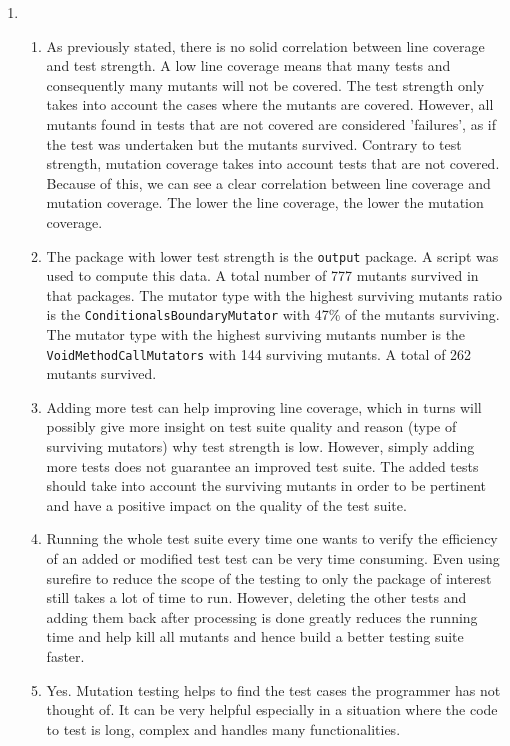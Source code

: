 \begin{enumerate}
    \item 
        \begin{enumerate}[label={\alph*.}]
            \item As previously stated, there is no solid correlation between line coverage and test strength. A low line coverage means that many tests and consequently many mutants will not be covered. The test strength only takes into account the cases where the mutants are covered. However, all mutants found in tests that are not covered are considered 'failures', as if the test was undertaken but the mutants survived. Contrary to test strength, mutation coverage takes into account tests that are not covered. Because of this, we can see a clear correlation between line coverage and mutation coverage. The lower the line coverage, the lower the mutation coverage.
            \item The package with lower test strength is the \verb|output| package. A script was used to compute this data. A total number of 777 mutants survived in that packages. The mutator type with the highest surviving mutants ratio is the \verb|ConditionalsBoundaryMutator| with 47\% of the mutants surviving. The mutator type with the highest surviving mutants number is the \verb|VoidMethodCallMutators| with 144 surviving mutants. A total of 262 mutants survived.
            \item Adding more test can help improving line coverage, which in turns will possibly give more insight on test suite quality and reason (type of surviving mutators) why test strength is low. However, simply adding more tests does not guarantee an improved test suite. The added tests should take into account the surviving mutants in order to be pertinent and have a positive impact on the quality of the test suite. 
            \item Running the whole test suite every time one wants to verify the efficiency of an added or modified test test can be very time consuming. Even using surefire to reduce the scope of the testing to only the package of interest still takes a lot of time to run. However, deleting the other tests and adding them back after processing is done greatly reduces the running time and help kill all mutants and hence build a better testing suite faster. 
            \item Yes. Mutation testing helps to find the test cases the programmer has not thought of. It can be very helpful especially in a situation where the code to test is long, complex and handles many functionalities. 
        \end{enumerate}
\end{enumerate}